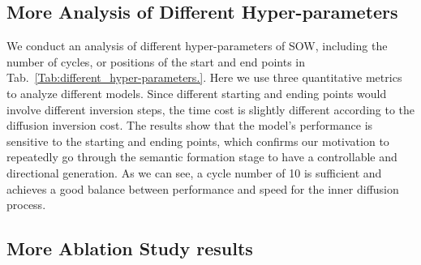 \subsection{More Analysis of Different Hyper-parameters}
\label{appen:hyperparameters}
We conduct an analysis of different hyper-parameters of SOW, including the number of cycles, or positions of the start and end points in Tab.~\ref{Tab:different_hyper-parameters.}.
Here we use three quantitative metrics to analyze different models. 
Since different starting and ending points would involve different inversion steps, the time cost is slightly different according to the diffusion inversion cost. 
The results show that the model's performance is sensitive to the starting and ending points, which confirms our motivation to repeatedly go through the semantic formation stage to have a controllable and directional generation.
As we can see, a cycle number of 10 is sufficient and achieves a good balance between performance and speed for the inner diffusion process.


\subsection{More Ablation Study results}
\label{ablation_study}


